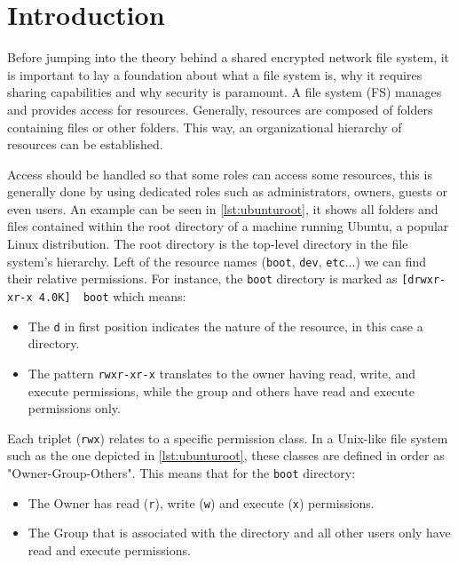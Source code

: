 \section*{Introduction}
Before jumping into the theory behind a shared encrypted network file system, it is important to lay a foundation about what a file system is, why it requires sharing capabilities and why security is paramount. A file system (FS) manages and provides access for resources. Generally, resources are composed of folders containing files or other folders. This way, an organizational hierarchy of resources can be established.
    


Access should be handled so that some roles can access some resources, this is generally done by using dedicated roles such as administrators, owners, guests or even users. An example can be seen in \autoref{lst:ubunturoot}, it shows all folders and files contained within the root directory of a machine running Ubuntu, a popular Linux distribution. The root directory is the top-level directory in the file system's hierarchy. Left of the resource names (\lstinline{boot}, \lstinline{dev}, \lstinline{etc}...) we can find their relative permissions. For instance, the \lstinline{boot} directory is marked as \lstinline{[drwxr-xr-x 4.0K]  boot} which means:

\begin{itemize}
    \item The \lstinline{d} in first position indicates the nature of the resource, in this case a directory.
    \item The pattern \lstinline{rwxr-xr-x} translates to the owner having read, write, and execute permissions, while the group and others have read and execute permissions only.
\end{itemize}

Each triplet (\lstinline{rwx}) relates to a specific permission class. In a Unix-like file system such as the one depicted in \autoref{lst:ubunturoot}, these classes are defined in order as "Owner-Group-Others". This means that for the \lstinline{boot} directory:

\begin{itemize}
    \item The Owner has read (\lstinline{r}), write (\lstinline{w}) and execute (\lstinline{x}) permissions.
    \item The Group that is associated with the directory and all other users only have read and execute permissions.
\end{itemize}

